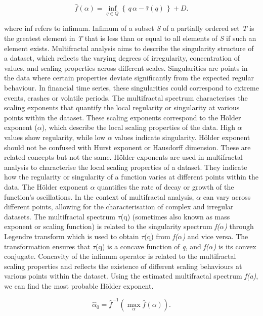 \documentclass[12pt,a4paper]{report}
\numberwithin{equation}{section}
\begin{document}
\begin{equation}\label{eq:3.1.10}
\widehat{f}(\alpha)
= \inf_{q\in Q}\left\{\, q\,\alpha - \widehat{\tau}(q) \,\right\} + D .
\end{equation}

where inf refers to infimum. Infimum of a subset \emph{S} of a partially
ordered set \emph{T} is the greatest element in \emph{T} that is less
than or equal to all elements of \emph{S} if such an element exists.
Multifractal analysis aims to describe the singularity structure of a
dataset, which reflects the varying degrees of irregularity,
concentration of values, and scaling properties across different scales.
Singularities are points in the data where certain properties deviate
significantly from the expected regular behaviour. In financial time
series, these singularities could correspond to extreme events, crashes
or volatile periods. The multifractal spectrum characterises the scaling
exponents that quantify the local regularity or singularity at various
points within the dataset. These scaling exponents correspond to the
Hölder exponent (\emph{$\alpha$}), which describe the local scaling properties
of the data. High \emph{$\alpha$} values show regularity, while low $\alpha$ values
indicate singularity. Hölder exponent should not be confused with Hurst
exponent or Hausdorff dimension. These are related concepts but not the
same. Hölder exponents are used in multifractal analysis to characterise
the local scaling properties of a dataset. They indicate how the
regularity or singularity of a function varies at different points
within the data. The Hölder exponent $\alpha$ quantifies the rate of decay or
growth of the function's oscillations. 
In the context of multifractal analysis, $\alpha$ can vary across different
points, allowing for the characterisation of complex and irregular
datasets. The multifractal spectrum $\tau$(q) (sometimes also known as mass
exponent or scaling function) is related to the singularity spectrum
\emph{f($\alpha$)} through Legendre transform which is used to obtain $\tau$(q) from
\emph{f($\alpha$)} and vice versa. The transformation ensures that $\tau$(q) is a
concave function of \emph{q}, and \emph{f($\alpha$)} is its convex conjugate.
Concavity of the infimum operator is related to the multifractal scaling
properties and reflects the existence of different scaling behaviours at
various points within the dataset. Using the estimated multifractal
spectrum \emph{f(a)}, we can find the most probable H\"older exponent.

\begin{equation}\label{eq:3.1.11}
\widehat{\alpha}_0
= \widehat{f}^{-1}\!\left(\max_{\alpha}\widehat{f}(\alpha)\right).
\end{equation}
\end{document}
